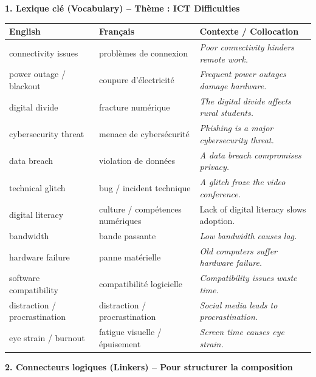 \documentclass[11pt]{article}
\newcommand{\cle}[1]{{\popxbold\color{popdark}#1}}
\newcommand{\eng}[1]{\ifmmode\text{\textit{#1}}\else\begingroup\selectlanguage{english}\itshape #1\endgroup\fi}
\begin{document}
\begin{bilan}

\textbf{1. Lexique clé (Vocabulary) -- Thème : ICT Difficulties}

\begin{center}
\begin{tabularx}{\linewidth}{|X|X|X|}
\hline
\rowcolor{popblueL}
\textbf{English} & \textbf{Français} & \textbf{Contexte / Collocation} \\
\hline
\cle{connectivity issues} & problèmes de connexion & \eng{Poor connectivity hinders remote work.} \\
\cle{power outage} / \cle{blackout} & coupure d'électricité & \eng{Frequent power outages damage hardware.} \\
\cle{digital divide} & fracture numérique & \eng{The digital divide affects rural students.} \\
\cle{cybersecurity threat} & menace de cybersécurité & \eng{Phishing is a major cybersecurity threat.} \\
\cle{data breach} & violation de données & \eng{A data breach compromises privacy.} \\
\cle{technical glitch} & bug / incident technique & \eng{A glitch froze the video conference.} \\
\cle{digital literacy} & culture / compétences numériques & \cle{Lack of digital literacy} slows adoption. \\
\cle{bandwidth} & bande passante & \eng{Low bandwidth causes lag.} \\
\cle{hardware failure} & panne matérielle & \eng{Old computers suffer hardware failure.} \\
\cle{software compatibility} & compatibilité logicielle & \eng{Compatibility issues waste time.} \\
\cle{distraction} / \cle{procrastination} & distraction / procrastination & \eng{Social media leads to procrastination.} \\
\cle{eye strain} / \cle{burnout} & fatigue visuelle / épuisement & \eng{Screen time causes eye strain.} \\
\hline
\end{tabularx}
\end{center}

\vspace{0.5em}
\textbf{2. Connecteurs logiques (Linkers) -- Pour structurer la composition}


\end{bilan}
\end{document}
